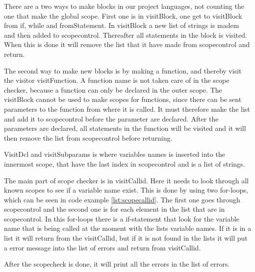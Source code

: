 There are a two ways to make blocks in our project languages, not counting the one that make the global scope. First one is in visitBlock, one get to visitBlock from if, while and fromStatement. In visitBlock a new list of strings is madem and then added to scopecontrol. Thereafter all statements in the block is visited. When this is done it will remove the list that it have made from scopecontrol and return.

The second way to make new blocks is by making a function, and thereby visit the visitor visitFunction. A function name is not taken care of in the scope checker, because a function can only be declared in the outer scope. The visitBlock cannot be used to make scopes for functions, since there can be sent parameters to the function from where it is called. It must therefore make the list and add it to scopecontrol before the parameter are declared. After the parameters are declared, all statements in the function will be visited and it will then remove the list from scopecontrol before returning.

VisitDcl and visitSubparams is where variables names is inserted into the innermost scope, that have the last index in scopecontrol and is a list of strings.

The main part of scope checker is in visitCallid. Here it needs to look through all known scopes to see if a variable name exist. This is done by using two for-loops, which can be seen in code example \ref{lst:scopecallid}. The first one goes through scopecontrol and the second one is for each element in the list that are in scopecontrol. In this for-loops there is a if-statement that look for the variable name that is being called at the moment with the lists variable names. If it is in a list it will return from the visitCallid, but if it is not found in the lists it will put a error message into the list of errors and return from visitCallid.

 

After the scopecheck is done, it will print all the errors in the list of errors.

